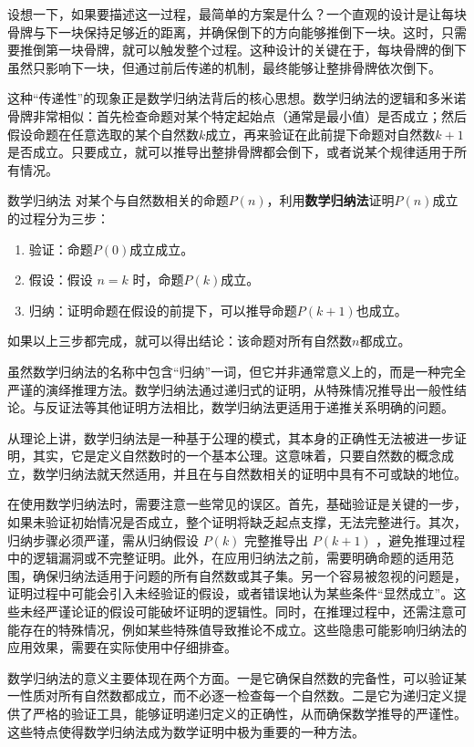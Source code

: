 设想一下，如果要描述这一过程，最简单的方案是什么？一个直观的设计是让每块骨牌与下一块保持足够近的距离，并确保倒下的方向能够推倒下一块。这时，只需要推倒第一块骨牌，就可以触发整个过程。这种设计的关键在于，每块骨牌的倒下虽然只影响下一块，但通过前后传递的机制，最终能够让整排骨牌依次倒下。

这种“传递性”的现象正是数学归纳法背后的核心思想。数学归纳法的逻辑和多米诺骨牌非常相似：首先检查命题对某个特定起始点（通常是最小值）是否成立；然后假设命题在任意选取的某个自然数$k$成立，再来验证在此前提下命题对自然数$k+1$是否成立。只要成立，就可以推导出整排骨牌都会倒下，或者说某个规律适用于所有情况。

\begin{definition}{数学归纳法}
对某个与自然数相关的命题$P(n)$，利用\textbf{数学归纳法}证明$P(n)$成立的过程分为三步：
\begin{enumerate}
\item 验证：命题$P(0)$成立成立。
\item 假设：假设 $n = k$ 时，命题$P(k)$成立。
\item 归纳：证明命题在假设的前提下，可以推导命题$P(k+1)$也成立。
\end{enumerate}
如果以上三步都完成，就可以得出结论：该命题对所有自然数$n$都成立。
\end{definition}

虽然数学归纳法的名称中包含“归纳”一词，但它并非通常意义上的，而是一种完全严谨的演绎推理方法。数学归纳法通过递归式的证明，从特殊情况推导出一般性结论。与反证法等其他证明方法相比，数学归纳法更适用于递推关系明确的问题。

从理论上讲，数学归纳法是一种基于公理的模式，其本身的正确性无法被进一步证明，其实，它是定义自然数时的一个基本公理。这意味着，只要自然数的概念成立，数学归纳法就天然适用，并且在与自然数相关的证明中具有不可或缺的地位。

在使用数学归纳法时，需要注意一些常见的误区。首先，基础验证是关键的一步，如果未验证初始情况是否成立，整个证明将缺乏起点支撑，无法完整进行。其次，归纳步骤必须严谨，需从归纳假设  $P(k)$  完整推导出  $P(k+1)$ ，避免推理过程中的逻辑漏洞或不完整证明。此外，在应用归纳法之前，需要明确命题的适用范围，确保归纳法适用于问题的所有自然数或其子集。另一个容易被忽视的问题是，证明过程中可能会引入未经验证的假设，或者错误地认为某些条件“显然成立”。这些未经严谨论证的假设可能破坏证明的逻辑性。同时，在推理过程中，还需注意可能存在的特殊情况，例如某些特殊值导致推论不成立。这些隐患可能影响归纳法的应用效果，需要在实际使用中仔细排查。

数学归纳法的意义主要体现在两个方面。一是它确保自然数的完备性，可以验证某一性质对所有自然数都成立，而不必逐一检查每一个自然数。二是它为递归定义提供了严格的验证工具，能够证明递归定义的正确性，从而确保数学推导的严谨性。这些特点使得数学归纳法成为数学证明中极为重要的一种方法。

